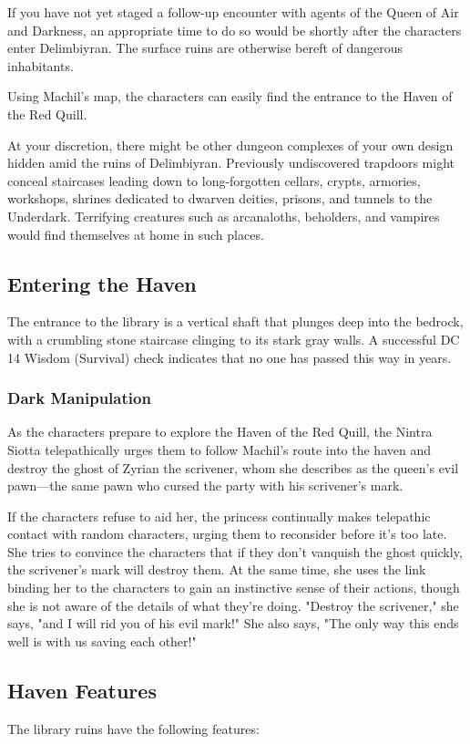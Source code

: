 \documentclass[10pt,a4paper,twoside,bg=print,twocolumn,openany,nodeprecatedcode]{dndbook}
\begin{document}
If you have not yet staged a follow-up encounter with agents of the Queen of Air and Darkness, an appropriate time to do so would be shortly after the characters enter Delimbiyran. The surface ruins are otherwise bereft of dangerous inhabitants.

Using Machil's map, the characters can easily find the entrance to the Haven of the Red Quill.

At your discretion, there might be other dungeon complexes of your own design hidden amid the ruins of Delimbiyran. Previously undiscovered trapdoors might conceal staircases leading down to long-forgotten cellars, crypts, armories, workshops, shrines dedicated to dwarven deities, prisons, and tunnels to the Underdark. Terrifying creatures such as arcanaloths, beholders, and vampires would find themselves at home in such places.

\subsection{Entering the Haven}
The entrance to the library is a vertical shaft that plunges deep into the bedrock, with a crumbling stone staircase clinging to its stark gray walls. A successful DC 14 Wisdom (Survival) check indicates that no one has passed this way in years.

\subsubsection{Dark Manipulation}
As the characters prepare to explore the Haven of the Red Quill, the Nintra Siotta telepathically urges them to follow Machil's route into the haven and destroy the ghost of Zyrian the scrivener, whom she describes as the queen's evil pawn—the same pawn who cursed the party with his scrivener's mark.

If the characters refuse to aid her, the princess continually makes telepathic contact with random characters, urging them to reconsider before it's too late. She tries to convince the characters that if they don't vanquish the ghost quickly, the scrivener's mark will destroy them. At the same time, she uses the link binding her to the characters to gain an instinctive sense of their actions, though she is not aware of the details of what they're doing. "Destroy the scrivener," she says, "and I will rid you of his evil mark!" She also says, "The only way this ends well is with us saving each other!"

\subsection{Haven Features}
The library ruins have the following features:
\end{document}
